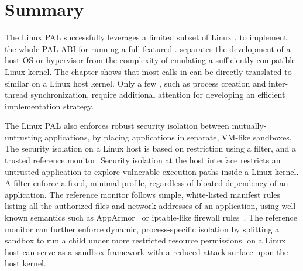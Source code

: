 \section{Summary}



The Linux PAL successfully leverages a limited subset of Linux \linuxapis{},
to implement the whole PAL ABI for running a
full-featured \libos{}.
\Thehostabi{} separates the development of a host OS or hypervisor
from the complexity of emulating a sufficiently-compatible
Linux kernel.
The chapter shows that most calls in \thehostabi{}
can be directly translated to similar \linuxapis{} on a Linux host kernel.
Only a few \hostapis{}, such as process creation and inter-thread synchronization, require additional attention for developing an efficient implementation strategy.



The Linux PAL also enforces robust security isolation
between mutually-untrusting applications,
by placing applications in separate, VM-like sandboxes.
The security isolation on a Linux host is based on \linuxapi{} restriction using a \seccomp{} filter, and a trusted reference monitor. %
Security isolation at the host interface
restricts an untrusted application to explore vulnerable execution paths
inside a Linux kernel.
A \seccomp{} filter 
enforce a fixed, minimal \linuxapi{} profile, regardless of bloated dependency of an application.
The reference monitor follows
simple, white-listed manifest rules listing 
all the authorized files and network addresses of an application,
using well-known semantics
such as AppArmor~\cite{apparmor} or iptable-like firewall rules~\cite{iptablesman}.
The reference monitor can further enforce dynamic, process-specific isolation by splitting a sandbox
to run a child \picoproc{} under more restricted
resource permissions.
\graphene{} on a Linux host can serve as a sandbox framework
with a reduced attack surface
upon the host kernel.






